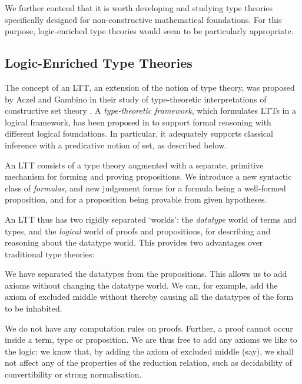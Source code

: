 \documentclass[acmtocl]{acmtrans2m}
\begin{document}
We further contend that it is worth developing and studying type
theories specifically designed for non-constructive mathematical
foundations.  For this purpose,
logic-enriched type theories would seem to be particularly appropriate.

\subsection{Logic-Enriched Type Theories}

The concept of an LTT, an extension of the notion of type theory,
was proposed by Aczel and Gambino in their study of type-theoretic
interpretations of constructive set theory
\cite{ag:cpdtt,ga:gticst}.
A \emph{type-theoretic framework}, which
formulates LTTs in a logical framework, has been proposed in
\cite{luo:LTT06} to support formal reasoning with different logical
foundations.  In particular, it adequately supports classical
inference with a predicative notion of set, as described below.



An LTT consists of a type theory augmented with a separate,
primitive mechanism for forming and proving propositions.  We
introduce a new syntactic class of \emph{formulas}, and new
judgement forms for a formula being a well-formed proposition, and
for a proposition being provable from given hypotheses.


An LTT thus has two rigidly separated `worlds': the
\emph{datatype} world of terms and types, and the \emph{logical}
world of proofs and propositions, for describing and
reasoning about the datatype world.  This provides two advantages over traditional type theories:

\begin{longitem}
\item
We have separated the datatypes from the propositions.  This allows us to add axioms without changing the datatype world.  We can, for example, add the axiom of excluded middle without thereby causing all the datatypes of the form  to be inhabited.
\item
We do not have any computation rules on proofs.  Further, a proof cannot occur inside a term, type or proposition.  We are thus free to add any axioms we like to the logic: we know that, by adding the axiom of excluded middle (say),  we shall not affect any of the properties of the reduction relation, such as decidability of convertibility or strong normalisation.
\end{longitem}
\end{document}
